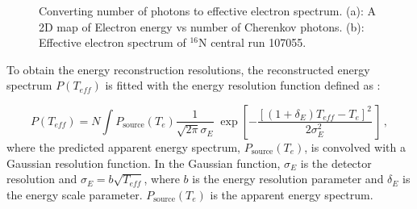 \begin{figure}[htbp]
	\centering
	\caption[Converting number of photons to effective electron spectrum.]{Converting number of photons to effective electron spectrum. (a): A 2D map of Electron energy vs number of Cherenkov photons. (b):	Effective electron spectrum of $^{16}$N central run 107055.\label{N16energyMap}}
\end{figure}

To obtain the energy reconstruction resolutions, the reconstructed energy spectrum $P(T_{eff})$ is fitted with the energy resolution function defined as \cite{waterunidoc}:

\begin{equation}
P(T_{eff})=N\int P_\mathrm{source}(T_e)\frac{1}{\sqrt{2\pi}\sigma_E} \; \exp \left[ -\frac{[(1+\delta_E)T_{eff}-T_e]^2}{2\sigma_E^2} \, \right] \, ,
\end{equation}
where the predicted apparent energy spectrum, $P_\mathrm{source}(T_e)$, is convolved with a Gaussian resolution function. In the Gaussian function, $\sigma_E$ is the detector resolution and $\sigma_E = b\sqrt {T_{eff}}$, where $b$ is the energy resolution parameter and $\delta_E$ is the energy scale parameter. $P_\mathrm{source}(T_e)$ is the apparent energy spectrum.

